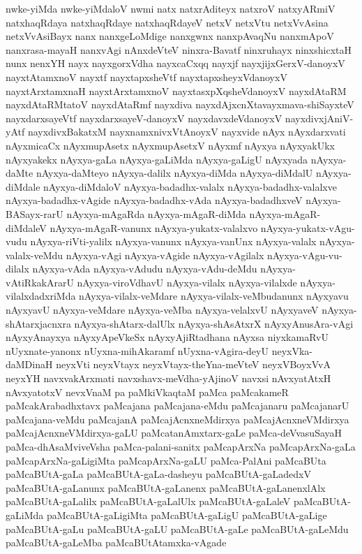 {nwke-yiMda
nwke-yiMdaloV
nwmi
natx
natxrAditeyx
natxroV
natxyARmiV
natxhaqRdaya
natxhaqRdaye
natxhaqRdayeV
netxV
netxVtu
netxVvAsina
netxVvAsiBayx
nanx
nanxgeLoMdige
nanxgwnx
nanxpAvaqNu
nanxmApoV
nanxrasa-mayaH
nanxvAgi
nAnxdeVteV
ninxra-Bavatf
ninxruhayx
ninxshicxtaH
nunx
nenxYH
nayx
nayxgorxVdha
nayxcaCxqq
nayxjf
nayxjijxGerxV-danoyxV
nayxtAtamxnoV
nayxtf
nayxtapxsheVtf
nayxtapxsheyxVdanoyxV
nayxtArxtamxnaH
nayxtArxtamxnoV
nayxtasxpXqsheVdanoyxV
nayxdAtaRM
nayxdAtaRMtatoV
nayxdAtaRmf
nayxdiva
nayxdAjxcnXtavayxmava-shiSayxteV
nayxdarxsayeVtf
nayxdarxsayeV-danoyxV
nayxdavxdeVdanoyxV
nayxdivxjAniV-yAtf
nayxdivxBakatxM
nayxnamxnivxVtAnoyxV
nayxvide
nAyx
nAyxdarxvati
nAyxmicaCx
nAyxmupAsetx
nAyxmupAsetxV
nAyxmf
nAyxya
nAyxyakUkx
nAyxyakekx
nAyxya-gaLa
nAyxya-gaLiMda
nAyxya-gaLigU
nAyxyada
nAyxya-daMte
nAyxya-daMteyo
nAyxya-dalilx
nAyxya-diMda
nAyxya-diMdalU
nAyxya-diMdale
nAyxya-diMdaloV
nAyxya-badadhx-valalx
nAyxya-badadhx-valalxve
nAyxya-badadhx-vAgide
nAyxya-badadhx-vAda
nAyxya-badadhxveV
nAyxya-BASayx-rarU
nAyxya-mAgaRda
nAyxya-mAgaR-diMda
nAyxya-mAgaR-diMdaleV
nAyxya-mAgaR-vanunx
nAyxya-yukatx-valalxvo
nAyxya-yukatx-vAgu-vudu
nAyxya-riVti-yalilx
nAyxya-vanunx
nAyxya-vanUnx
nAyxya-valalx
nAyxya-valalx-veMdu
nAyxya-vAgi
nAyxya-vAgide
nAyxya-vAgilalx
nAyxya-vAgu-vu-dilalx
nAyxya-vAda
nAyxya-vAdudu
nAyxya-vAdu-deMdu
nAyxya-vAtiRkakArarU
nAyxya-viroVdhavU
nAyxya-vilalx
nAyxya-vilalxde
nAyxya-vilalxdadxriMda
nAyxya-vilalx-veMdare
nAyxya-vilalx-veMbudanunx
nAyxyavu
nAyxyavU
nAyxya-veMdare
nAyxya-veMba
nAyxya-velalxvU
nAyxyaveV
nAyxya-shAtarxjacnxra
nAyxya-shAtarx-dalUlx
nAyxya-shAsAtxrX
nAyxyAnusAra-vAgi
nAyxyAnayxya
nAyxyApeVkeSx
nAyxyAjiRtadhana
nAyxsa
niyxkamaRvU
nUyxnate-yanonx
nUyxna-mihAkaramf
nUyxna-vAgira-deyU
neyxVka-daMDinaH
neyxVti
neyxVtayx
neyxVtayx-theYna-meVteV
neyxVBoyxVvA
neyxYH
navxvakArxmati
navxshavx-meVdha-yAjinoV
navxsi
nAvxyatAtxH
nAvxyatotxV
nevxVnaM
pa
paMkiVkaqtaM
paMca
paMcakameR
paMcakArabadhxtavx
paMcajana
paMcajana-eMdu
paMcajanaru
paMcajanarU
paMcajana-veMdu
paMcajanA
paMcajAcnxneMdirxya
paMcajAcnxneVMdirxya
paMcajAcnxneVMdirxya-gaLU
paMcatanAmxtarx-gaLe
paMca-deVvasuSayaH
paMca-dhAsaMviveVsha
paMca-palani-sanitx
paMcapArxNa
paMcapArxNa-gaLa
paMcapArxNa-gaLigiMta
paMcapArxNa-gaLU
paMca-PalAni
paMcaBUta
paMcaBUtA-gaLa
paMcaBUtA-gaLa-dasheyu
paMcaBUtA-gaLadedxV
paMcaBUtA-gaLanunx
paMcaBUtA-gaLanenx
paMcaBUtA-gaLanenxlAlx
paMcaBUtA-gaLalilx
paMcaBUtA-gaLalUlx
paMcaBUtA-gaLaleV
paMcaBUtA-gaLiMda
paMcaBUtA-gaLigiMta
paMcaBUtA-gaLigU
paMcaBUtA-gaLige
paMcaBUtA-gaLu
paMcaBUtA-gaLU
paMcaBUtA-gaLe
paMcaBUtA-gaLeMdu
paMcaBUtA-gaLeMba
paMcaBUtAtamxka-vAgade
}
